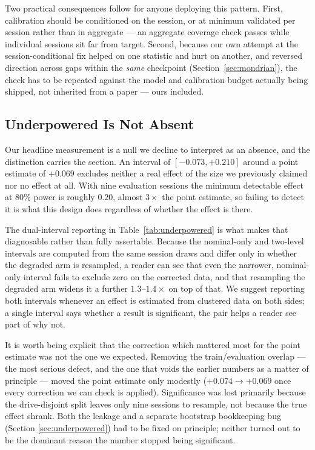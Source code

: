 Two practical consequences follow for anyone deploying this pattern. First,
calibration should be conditioned on the session, or at minimum validated
per session rather than in aggregate --- an aggregate coverage check passes
while individual sessions sit far from target. Second, because our own
attempt at the session-conditional fix helped on one statistic and hurt on
another, and reversed direction across gaps within the \emph{same}
checkpoint (Section~\ref{sec:mondrian}), the check has to be repeated
against the model and calibration budget actually being shipped, not
inherited from a paper --- ours included.

\subsection{Underpowered Is Not Absent}
\label{sec:discuss-power}

Our headline measurement is a null we decline to interpret as an absence,
and the distinction carries the section. An interval of $[-0.073, +0.210]$
around a point estimate of $+0.069$ excludes neither a real effect of the
size we previously claimed nor no effect at all. With nine evaluation
sessions the minimum detectable effect at 80\% power is roughly $0.20$,
almost $3\times$ the point estimate, so failing to detect it is what this
design does regardless of whether the effect is there.

The dual-interval reporting in Table~\ref{tab:underpowered} is what makes
that diagnosable rather than fully assertable. Because the nominal-only and
two-level intervals are computed from the same session draws and differ
only in whether the degraded arm is resampled, a reader can see that even
the narrower, nominal-only interval fails to exclude zero on the corrected
data, and that resampling the degraded arm widens it a further
$1.3$--$1.4\times$ on top of that. We suggest reporting both intervals
whenever an effect is estimated from clustered data on both sides; a single
interval says whether a result is significant, the pair helps a reader see
part of why not.

It is worth being explicit that the correction which mattered most for the
point estimate was not the one we expected. Removing the train/evaluation
overlap --- the most serious defect, and the one that voids the earlier
numbers as a matter of principle --- moved the point estimate only modestly
($+0.074 \rightarrow +0.069$ once every correction we can check is applied).
Significance was lost primarily because the drive-disjoint split leaves
only nine sessions to resample, not because the true effect shrank. Both
the leakage and a separate bootstrap bookkeeping bug (Section
\ref{sec:underpowered}) had to be fixed on principle; neither turned out to
be the dominant reason the number stopped being significant.

